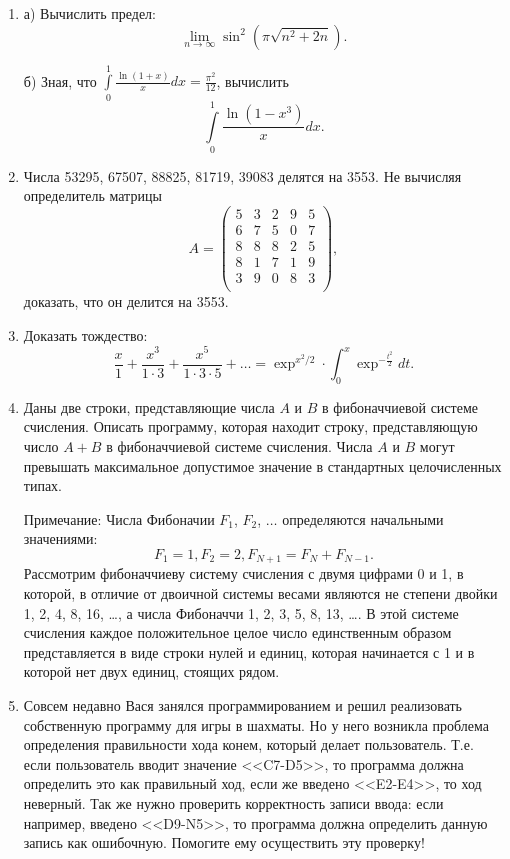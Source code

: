 \begin{enumerate}
\item а) Вычислить предел:
$$\lim_{n \to \infty} \sin^2 \left( \pi \sqrt{n^2 + 2n}\right).$$

б) Зная, что $\int\limits_{0}^{1} 
\frac{\ln(1+x)}{x} dx = \frac{\pi^2}{12}$, вычислить
$$\int\limits_{0}^{1} 
\frac{\ln(1-x^3)}{x} dx.$$

\item Числа 53295, 67507, 88825, 81719, 39083 делятся на 3553. Не вычисляя определитель матрицы $$A = 
\begin{pmatrix}
5 & 3 & 2 & 9 & 5 \\
6 & 7 & 5 & 0 & 7 \\
8 & 8 & 8 & 2 & 5 \\
8 & 1 & 7 & 1 & 9 \\
3 & 9 & 0 & 8 & 3 \\
\end{pmatrix},
$$
доказать, что он делится на 3553.

\item Доказать тождество:
$$\frac{x}{1} + 
\frac{x^3}{1 \cdot 3 }+
\frac{x^5}{1 \cdot 3 \cdot 5} + \ldots = 
\exp^{x^2/2} \cdot \int_{0}^{x} \exp^{-\frac{t^2}{2}} dt.$$

\item Даны две строки, представляющие числа $A$ и $B$ в фибоначчиевой системе счисления. Описать программу, которая находит строку, представляющую число $A + B$ в фибоначчиевой системе счисления. Числа $A$ и $B$ могут превышать максимальное допустимое значение в стандартных целочисленных типах.

Примечание: Числа Фибоначии $F_1$, $F_2$, $\ldots$ определяются начальными значениями:
$$F_1 = 1, F_2 = 2, F_{N+1} = F_N + F_{N-1}.$$
Рассмотрим фибоначчиеву систему счисления с двумя цифрами 0 и 1, в которой, в отличие от двоичной системы весами являются не степени двойки 1, 2, 4, 8, 16, \ldots, а числа Фибоначчи 1, 2, 3, 5, 8, 13, \ldots. В этой системе счисления каждое положительное целое число единственным образом представляется в виде строки нулей и единиц, которая начинается с 1 и в которой нет двух единиц, стоящих рядом.

\item Совсем недавно Вася занялся программированием и решил реализовать собственную программу для игры в шахматы. Но у него возникла проблема определения правильности хода конем, который делает пользователь. Т.е. если пользователь вводит значение <<C7-D5>>, то программа должна определить это как правильный ход, если же введено <<E2-E4>>, то ход неверный. Так же нужно проверить корректность записи ввода: если например, введено <<D9-N5>>, то программа должна определить данную запись как ошибочную. Помогите ему осуществить эту проверку!


\end{enumerate}
